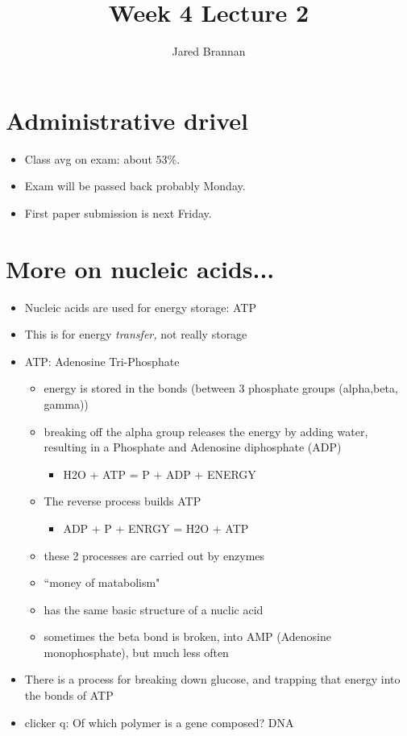 \documentclass{article}
\title{Week 4 Lecture 2}
\author{Jared Brannan }
\theoremstyle{definition}
\begin{document}
\maketitle

\section{Administrative drivel}
\begin{itemize}
	\item Class avg on exam: about $53\%$.
	\item Exam will be passed back probably Monday.
	\item First paper submission is next Friday.
\end{itemize}

\section{More on nucleic acids...}
\begin{itemize}
	\item  Nucleic acids are used for energy storage: ATP
	\item This is for energy \textit{transfer,}  not really storage
	\item ATP: Adenosine Tri-Phosphate
		\begin{itemize}
			\item energy is stored in the bonds (between 3 phosphate groups (alpha,beta, gamma))
			\item breaking off the alpha group releases the energy by adding water, resulting in a Phosphate and Adenosine diphosphate (ADP)
				\begin{itemize}
					\item H2O + ATP = P + ADP + ENERGY
				\end{itemize}
			\item The reverse process builds ATP
				\begin{itemize}
					\item ADP + P + ENRGY = H2O + ATP
				\end{itemize}
			\item these 2 processes are carried out by enzymes
			\item ``money of matabolism"
			\item has the same basic structure of a nuclic acid
			\item sometimes the beta bond is broken, into AMP (Adenosine monophosphate), but much less often
		\end{itemize}
	\item There is a process for breaking down glucose, and trapping that energy into the bonds of ATP
	\item clicker q: Of which polymer is a gene composed? DNA
\end{itemize}
\end{document}
